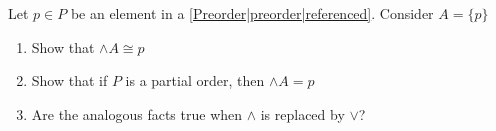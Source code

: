 
Let $p \in P$ be an element in a \ref{Preorder|preorder|referenced}. Consider $A = \{p\}$

    \begin{enumerate}
      \item Show that $\wedge A \cong p$
      \item Show that if $P$ is a partial order, then $\wedge A = p$
      \item Are the analogous facts true when $\wedge$ is replaced by $\vee$?
    \end{enumerate}
